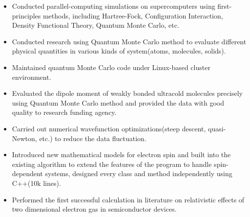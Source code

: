 \documentclass[11pt]{article} %
\begin{document}
\begin{itemize}
\item Conducted parallel-computing simulations on supercomputers using first-principles methods, including Hartree-Fock, Configuration Interaction, Density Functional Theory, Quantum Monte Carlo, etc.\\
\vspace{-4mm}
\item Conducted research using Quantum Monte Carlo method to evaluate different physical quantities in various kinds of system(atoms, molecules, solids).\\
\vspace{-4mm}
\item Maintained quantum Monte Carlo code under Linux-based cluster environment.\\
\vspace{-4mm}
\item Evaluated the dipole moment of weakly bonded ultracold molecules precisely using Quantum Monte Carlo method and provided the data with good quality to research funding agency.\\
\vspace{-4mm}
 \item Carried out numerical wavefunction optimizations(steep descent, quasi-Newton, etc.) to reduce the data fluctuation. \\
 \vspace{-4mm}
\item Introduced new mathematical models for electron spin and built into the existing algorithm to extend the features of the program to handle spin-dependent systems, designed every class and method independently using C++(10k lines). \\
\vspace{-4mm}
  \item Performed the first successful calculation in literature on relativistic effects of two dimensional electron gas in semiconductor devices.\\
\end{itemize}



\vspace{2mm}

 
 \\
\vspace{-5mm}
\end{document}

